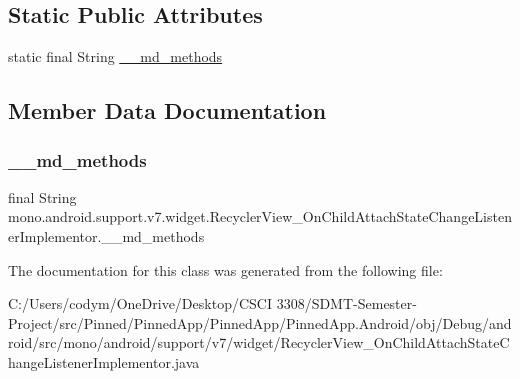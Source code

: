 \subsection*{Static Public Attributes}
\begin{DoxyCompactItemize}
\item 
static final String \hyperlink{classmono_1_1android_1_1support_1_1v7_1_1widget_1_1_recycler_view___on_child_attach_state_change_listener_implementor_aaa15da75df7533f4e3467fa457218139}{\+\_\+\+\_\+md\+\_\+methods}
\end{DoxyCompactItemize}


\subsection{Member Data Documentation}
\mbox{\label{classmono_1_1android_1_1support_1_1v7_1_1widget_1_1_recycler_view___on_child_attach_state_change_listener_implementor_aaa15da75df7533f4e3467fa457218139}} 
\subsubsection{\texorpdfstring{\+\_\+\+\_\+md\+\_\+methods}{\_\_md\_methods}}
{\footnotesize\ttfamily final String mono.\+android.\+support.\+v7.\+widget.\+Recycler\+View\+\_\+\+On\+Child\+Attach\+State\+Change\+Listener\+Implementor.\+\_\+\+\_\+md\+\_\+methods\hspace{0.3cm}{\ttfamily [static]}}



The documentation for this class was generated from the following file\+:\begin{DoxyCompactItemize}
\item 
C\+:/\+Users/codym/\+One\+Drive/\+Desktop/\+C\+S\+C\+I 3308/\+S\+D\+M\+T-\/\+Semester-\/\+Project/src/\+Pinned/\+Pinned\+App/\+Pinned\+App/\+Pinned\+App.\+Android/obj/\+Debug/android/src/mono/android/support/v7/widget/Recycler\+View\+\_\+\+On\+Child\+Attach\+State\+Change\+Listener\+Implementor.\+java\end{DoxyCompactItemize}
